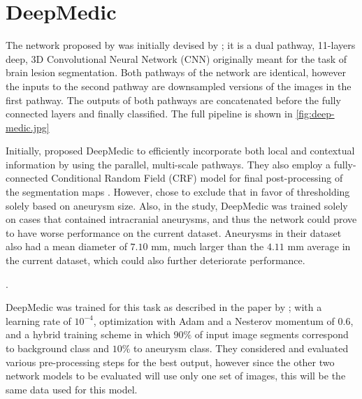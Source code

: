 

\section{DeepMedic}
The network proposed by \citeauthor{Sichermann2019} was initially devised by \citeauthor{Kamnitsas2017}; it is a dual pathway, 11-layers deep, 3D Convolutional Neural Network (CNN) originally meant for the task of brain lesion segmentation. Both pathways of the network are identical, however the inputs to the second pathway are downsampled versions of the images in the first pathway. The outputs of both pathways are concatenated before the fully connected layers and finally classified. The full pipeline is shown in \ref{fig:deep-medic.jpg} 


Initially, \citeauthor{Kamnitsas2017} proposed DeepMedic to efficiently incorporate both local and contextual information by using the parallel, multi-scale pathways. They also employ a fully-connected Conditional Random Field (CRF) model for final post-processing of the segmentation maps \cite{Krahenbuhl2012}. However, \citeauthor{Sichermann2019} chose to exclude that in favor of thresholding solely based on aneurysm size. Also, in the study, DeepMedic was trained solely on cases that contained intracranial aneurysms, and thus the network could prove to have worse performance on the current dataset. Aneurysms in their dataset also had a mean diameter of $7.10$ mm, much larger than the $4.11$ mm average in the current dataset, which could also further deteriorate performance. 

.

DeepMedic was trained for this task as described in the paper by \citeauthor{Sichermann2019}; with a learning rate of $10^{-4}$, optimization with Adam and a Nesterov momentum of $0.6$, and a hybrid training scheme in which $90\%$ of input image segments correspond to background class and $10\%$ to aneurysm class. They considered and evaluated various pre-processing steps for the best output, however since the other two network models to be evaluated will use only one set of images, this will be the same data used for this model. 

